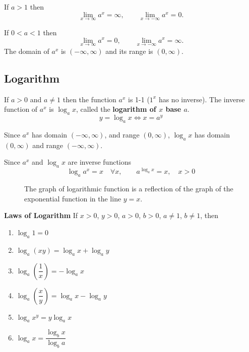 \documentclass[../calc1-main.tex]{subfiles}
\begin{document}
  If $a>1$ then
  \[
    \lim_{x \to \infty} a^x = \infty, \qquad
    \lim_{x \to -\infty} a^x = 0.
  \]

  If $0<a<1$ then
  \[
    \lim_{x \to \infty} a^x = 0, \qquad
    \lim_{x \to -\infty} a^x = \infty.
  \]
  The domain of $a^x$ is $(-\infty, \infty)$ and its range is $(0, \infty)$.
  \begin{figure}[H]
    \centering
    
  \end{figure}

  \subsection*{Logarithm}

  If $a >0$ and $a \neq 1$ then the function $a^x$ is 1-1 ($1^x$ has no inverse). The inverse function of $a^x$ is $\log_a x$, called the \textbf{logarithm of $x$ base $a$}.
  \[
    y = \log_a x \iff x = a^y
  \]

  Since $a^x$ has domain $(-\infty, \infty)$, and range $(0, \infty)$, $\log_a x$ has domain $(0, \infty)$ and range $(-\infty, \infty)$.

  Since $a^x$ and $\log_a x$ are inverse functions
  \[
    \log_a a^x = x \quad \forall x, \qquad a^{\log_a x} = x, \quad x>0
  \]

  \begin{figure}[H]
    \centering
    
    \caption{The graph of logarithmic function is a reflection of the graph of the exponential function in the line $y = x$.}
  \end{figure}

  \textbf{Laws of Logarithm}
  If $x>0$, $y>0$, $a>0$, $b>0$, $a \neq 1$, $b \neq 1$, then

  \begin{multicols}{2}
    \begin{enumerate}
      \item $\log_a 1 = 0$
      \item $\log_a (x y) = \log_a x + \log_a y$
      \item $\log_a (\dfrac{1}{x}) = - \log_a x$
      \item $\log_a (\dfrac{x}{y}) = \log_a x - \log_a y$
      \item $\log_a x^y = y \log_a x$
      \item $\log_a x = \dfrac{\log_b x}{\log_b a}$
    \end{enumerate}
  \end{multicols}
\end{document}
